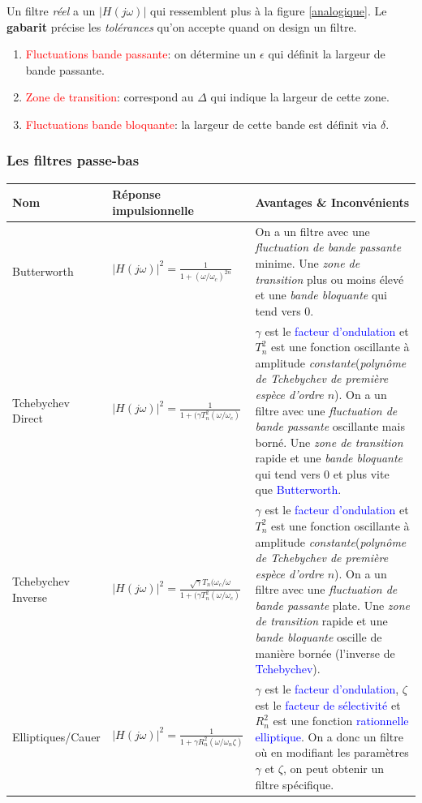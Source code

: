 \documentclass{report}
\begin{document}
Un filtre \textit{réel} a un $|H(j\omega)|$ qui ressemblent plus à la figure \ref{analogique}. Le \textbf{gabarit} précise les \textit{tolérances} qu'on accepte quand on design un filtre.
\begin{enumerate}
\item \textcolor{red}{Fluctuations bande passante}: on détermine un $\epsilon$ qui définit la largeur de bande passante.
\item \textcolor{red}{Zone de transition}: correspond au $\Delta$ qui indique la largeur de cette zone.
\item \textcolor{red}{Fluctuations bande bloquante}: la largeur de cette bande est définit via $\delta$.
\end{enumerate}

\subsubsection{Les filtres passe-bas}
\begin{center}
\begin{tabular}{|m{3cm}|m{5cm}|m{7cm}|}
\hline
\cellcolor[gray]{0.8} Nom &\cellcolor[gray]{0.8} Réponse impulsionnelle & \cellcolor[gray]{0.8} Avantages \& Inconvénients\\
\hline
Butterworth & $|H(j\omega)|^2 = \frac{1}{1+(\omega/\omega_c)^{2n}}$ & On a un filtre avec une \textit{fluctuation de bande passante} minime. Une \textit{zone de transition} plus ou moins élevé et une \textit{bande bloquante} qui tend vers 0.\\
\hline
Tchebychev Direct & $|H(j\omega)|^2 = \frac{1}{1+(\gamma T_n^2 (\omega /\omega_c)}$ &$\gamma$ est le \textcolor{blue}{facteur d'ondulation} et $T_n^2$ est une fonction oscillante à amplitude \textit{constante}(\textit{polynôme de Tchebychev de première espèce d'ordre $n$}). On a un filtre avec une \textit{fluctuation de bande passante} oscillante mais borné. Une \textit{zone de transition} rapide et une \textit{bande bloquante} qui tend vers 0 et plus vite que \textcolor{blue}{Butterworth}.\\
\hline
Tchebychev Inverse & $|H(j\omega)|^2 = \frac{\sqrt{\gamma}T_n(\omega_c/\omega}{1+(\gamma T_n^2 (\omega /\omega_c)}$ &$\gamma$ est le \textcolor{blue}{facteur d'ondulation} et $T_n^2$ est une fonction oscillante à amplitude \textit{constante}(\textit{polynôme de Tchebychev de première espèce d'ordre $n$}). On a un filtre avec une \textit{fluctuation de bande passante} plate. Une \textit{zone de transition} rapide et une \textit{bande bloquante} oscille de manière bornée (l'inverse de \textcolor{blue}{Tchebychev}).\\
\hline
Elliptiques/Cauer & $|H(j\omega)|^2 = \frac{1}{1+ \gamma R_n^2(\omega / \omega_n \zeta)}$ &$\gamma$ est le \textcolor{blue}{facteur d'ondulation}, $\zeta$ est le \textcolor{blue}{facteur de sélectivité} et $R_n^2$ est une fonction \textcolor{blue}{rationnelle elliptique}. On a donc un filtre où en modifiant les paramètres $\gamma$ et $\zeta$, on peut obtenir un filtre spécifique.\\
\hline
\end{tabular}
\end{center}
\end{document}

